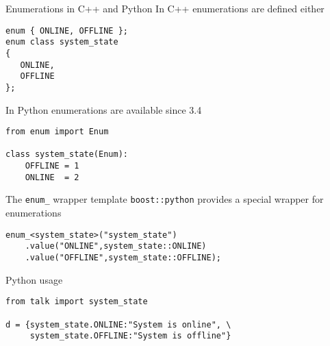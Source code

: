 
\begin{frame}[fragile]{Enumerations in C++ and Python}
    In C++ enumerations are defined either
    \begin{verbatim}
enum { ONLINE, OFFLINE };
enum class system_state
{ 
   ONLINE, 
   OFFLINE 
};
    \end{verbatim}

    \vspace{0.1\textheight}
    In Python enumerations are available since 3.4
    \begin{verbatim}
from enum import Enum

class system_state(Enum):
    OFFLINE = 1
    ONLINE  = 2
    \end{verbatim}
\end{frame}

\begin{frame}[fragile]{The \texttt{enum\_} wrapper template}
    \texttt{boost::python} provides a special wrapper for enumerations
    \vspace{0.025\textheight}
    \begin{verbatim}
enum_<system_state>("system_state")
    .value("ONLINE",system_state::ONLINE)
    .value("OFFLINE",system_state::OFFLINE);
    \end{verbatim}
    \vspace{0.1\textheight}
    Python usage
    \vspace{0.025\textheight}
    \begin{verbatim}
from talk import system_state

d = {system_state.ONLINE:"System is online", \
     system_state.OFFLINE:"System is offline"}
    \end{verbatim}


\end{frame}

